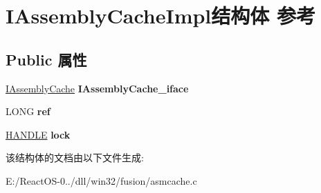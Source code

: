 \hypertarget{struct_i_assembly_cache_impl}{}\section{I\+Assembly\+Cache\+Impl结构体 参考}
\label{struct_i_assembly_cache_impl}
\subsection*{Public 属性}
\begin{DoxyCompactItemize}
\item 
\mbox{\label{struct_i_assembly_cache_impl_a0ee1aa0187f08b74143354135118d019}} 
\hyperlink{interface_i_assembly_cache}{I\+Assembly\+Cache} {\bfseries I\+Assembly\+Cache\+\_\+iface}
\item 
\mbox{\label{struct_i_assembly_cache_impl_aa93cc38d708b443ae3d677f9c38e14ed}} 
L\+O\+NG {\bfseries ref}
\item 
\mbox{\label{struct_i_assembly_cache_impl_a921f46693cfe931142bce8e0e82c7d44}} 
\hyperlink{interfacevoid}{H\+A\+N\+D\+LE} {\bfseries lock}
\end{DoxyCompactItemize}


该结构体的文档由以下文件生成\+:\begin{DoxyCompactItemize}
\item 
E\+:/\+React\+O\+S-\/0../dll/win32/fusion/asmcache.\+c\end{DoxyCompactItemize}
